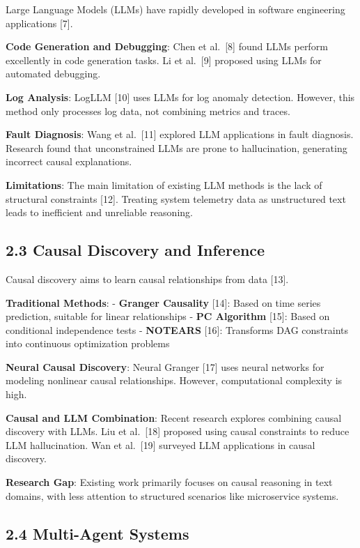 Large Language Models (LLMs) have rapidly developed in software
engineering applications {[}7{]}.

\textbf{Code Generation and Debugging}: Chen et al.~{[}8{]} found LLMs
perform excellently in code generation tasks. Li et al.~{[}9{]} proposed
using LLMs for automated debugging.

\textbf{Log Analysis}: LogLLM {[}10{]} uses LLMs for log anomaly
detection. However, this method only processes log data, not combining
metrics and traces.

\textbf{Fault Diagnosis}: Wang et al.~{[}11{]} explored LLM applications
in fault diagnosis. Research found that unconstrained LLMs are prone to
hallucination, generating incorrect causal explanations.

\textbf{Limitations}: The main limitation of existing LLM methods is the
lack of structural constraints {[}12{]}. Treating system telemetry data
as unstructured text leads to inefficient and unreliable reasoning.

\hypertarget{causal-discovery-and-inference}{%
\subsection{2.3 Causal Discovery and
Inference}\label{causal-discovery-and-inference}}

Causal discovery aims to learn causal relationships from data {[}13{]}.

\textbf{Traditional Methods}: - \textbf{Granger Causality} {[}14{]}:
Based on time series prediction, suitable for linear relationships -
\textbf{PC Algorithm} {[}15{]}: Based on conditional independence tests
- \textbf{NOTEARS} {[}16{]}: Transforms DAG constraints into continuous
optimization problems

\textbf{Neural Causal Discovery}: Neural Granger {[}17{]} uses neural
networks for modeling nonlinear causal relationships. However,
computational complexity is high.

\textbf{Causal and LLM Combination}: Recent research explores combining
causal discovery with LLMs. Liu et al.~{[}18{]} proposed using causal
constraints to reduce LLM hallucination. Wan et al.~{[}19{]} surveyed
LLM applications in causal discovery.

\textbf{Research Gap}: Existing work primarily focuses on causal
reasoning in text domains, with less attention to structured scenarios
like microservice systems.

\hypertarget{multi-agent-systems}{%
\subsection{2.4 Multi-Agent Systems}\label{multi-agent-systems}}

